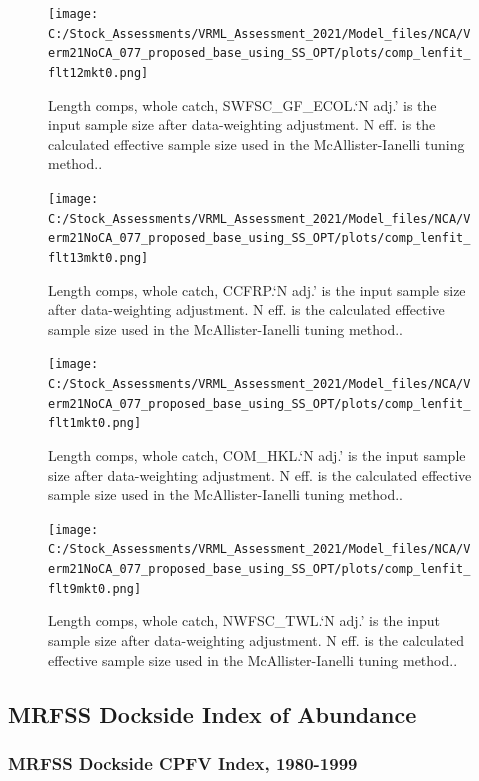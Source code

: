 \documentclass[
  english,
  a4paper,
]{article}
\begin{document}
\begin{figure}
\centering
\texttt{[image: C:/Stock\_Assessments/VRML\_Assessment\_2021/Model\_files/NCA/Verm21NoCA\_077\_proposed\_base\_using\_SS\_OPT/plots/comp\_lenfit\_flt12mkt0.png]}
\caption{Length comps, whole catch, SWFSC\_GF\_ECOL.`N adj.' is the input sample size after data-weighting adjustment. N eff. is the calculated effective sample size used in the McAllister-Ianelli tuning method..\label{fig:comp_lenfit_flt12mkt0}}
\end{figure}

\begin{figure}
\centering
\texttt{[image: C:/Stock\_Assessments/VRML\_Assessment\_2021/Model\_files/NCA/Verm21NoCA\_077\_proposed\_base\_using\_SS\_OPT/plots/comp\_lenfit\_flt13mkt0.png]}
\caption{Length comps, whole catch, CCFRP.`N adj.' is the input sample size after data-weighting adjustment. N eff. is the calculated effective sample size used in the McAllister-Ianelli tuning method..\label{fig:comp_lenfit_flt13mkt0}}
\end{figure}

\begin{figure}
\centering
\texttt{[image: C:/Stock\_Assessments/VRML\_Assessment\_2021/Model\_files/NCA/Verm21NoCA\_077\_proposed\_base\_using\_SS\_OPT/plots/comp\_lenfit\_flt1mkt0.png]}
\caption{Length comps, whole catch, COM\_HKL.`N adj.' is the input sample size after data-weighting adjustment. N eff. is the calculated effective sample size used in the McAllister-Ianelli tuning method..\label{fig:comp_lenfit_flt1mkt0}}
\end{figure}

\begin{figure}
\centering
\texttt{[image: C:/Stock\_Assessments/VRML\_Assessment\_2021/Model\_files/NCA/Verm21NoCA\_077\_proposed\_base\_using\_SS\_OPT/plots/comp\_lenfit\_flt9mkt0.png]}
\caption{Length comps, whole catch, NWFSC\_TWL.`N adj.' is the input sample size after data-weighting adjustment. N eff. is the calculated effective sample size used in the McAllister-Ianelli tuning method..\label{fig:comp_lenfit_flt9mkt0}}
\end{figure}

\clearpage

\hypertarget{mrfss-index}{%
\subsection{MRFSS Dockside Index of Abundance}\label{mrfss-index}}

\hypertarget{mrfss-dockside-cpfv-index-1980-1999}{%
\subsubsection{MRFSS Dockside CPFV Index, 1980-1999}\label{mrfss-dockside-cpfv-index-1980-1999}}
\end{document}
